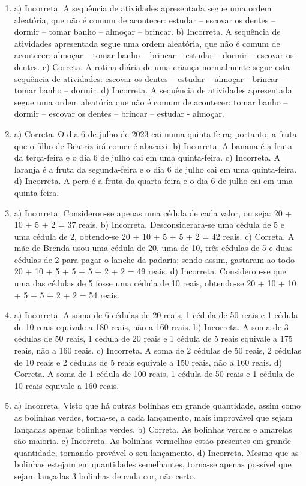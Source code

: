 \begin{enumerate}
\item
a) Incorreta. A sequência de atividades apresentada segue uma ordem
aleatória, que não é comum de acontecer: estudar -- escovar os dentes --
dormir -- tomar banho -- almoçar -- brincar.
b) Incorreta. A sequência de atividades apresentada segue uma ordem
aleatória, que não é comum de acontecer: almoçar -- tomar banho -- brincar
-- estudar -- dormir -- escovar os dentes.
c) Correta. A rotina diária de uma criança normalmente segue esta sequência
de atividades: escovar os dentes -- estudar -- almoçar - brincar -- tomar banho -- dormir.
d) Incorreta. A sequência de atividades apresentada segue uma ordem
aleatória que não é comum de acontecer: tomar banho -- dormir -- escovar
os dentes -- brincar -- estudar - almoçar.

\item
a) Correta. O dia 6 de julho de 2023 cai numa quinta-feira; portanto; a
fruta que o filho de Beatriz irá comer é abacaxi.
b) Incorreta. A banana é a fruta da terça-feira e o dia 6 de julho cai
em uma quinta-feira.
c) Incorreta. A laranja é a fruta da segunda-feira e o dia 6 de julho
cai em uma quinta-feira.
d) Incorreta. A pera é a fruta da quarta-feira e o dia 6 de julho cai em uma quinta-feira.

\item
a) Incorreta. Considerou-se apenas uma cédula de cada valor, ou seja: 20 +
10 + 5 + 2 = 37 reais.
b) Incorreta. Desconsiderara-se uma cédula de 5 e uma cédula de 2, obtendo-se
20 + 10 + 5 + 5 + 2 = 42 reais.
c) Correta. A mãe de Brenda usou uma cédula de 20, uma de 10, três
cédulas de 5 e duas cédulas de 2 para pagar o lanche da padaria; sendo
assim, gastaram ao todo 20 + 10 + 5 + 5 + 5 + 2 + 2 = 49 reais.
d) Incorreta. Considerou-se que uma das cédulas de 5 fosse uma cédula de 10
reais, obtendo-se 20 + 10 + 10 + 5 + 5 + 2 + 2 = 54 reais.

\item
a) Incorreta. A soma de 6 cédulas de 20 reais, 1 cédula de 50 reais e 1
cédula de 10 reais equivale a 180 reais, não a 160 reais.
b) Incorreta. A soma de 3 cédulas de 50 reais, 1 cédula de 20 reais e 1
cédula de 5 reais equivale a 175 reais, não a 160 reais.
c) Incorreta. A soma de 2 cédulas de 50 reais, 2 cédulas de 10 reais e 2
cédulas de 5 reais equivale a 150 reais, não a 160 reais.
d) Correta. A soma de 1 cédula de 100 reais, 1 cédula de 50 reais e 1
cédula de 10 reais equivale a 160 reais.

\item
a) Incorreta. Visto que há outras bolinhas em grande quantidade, assim
como as bolinhas verdes, torna-se, a cada lançamento, mais improvável
que sejam lançadas apenas bolinhas verdes.
b) Correta. As bolinhas verdes e amarelas são maioria.
c) Incorreta. As bolinhas vermelhas estão presentes em grande
quantidade, tornando provável o seu lançamento.
d) Incorreta. Mesmo que as bolinhas estejam em quantidades semelhantes,
torna-se apenas possível que sejam lançadas 3 bolinhas de cada cor, não certo.


\end{enumerate}

